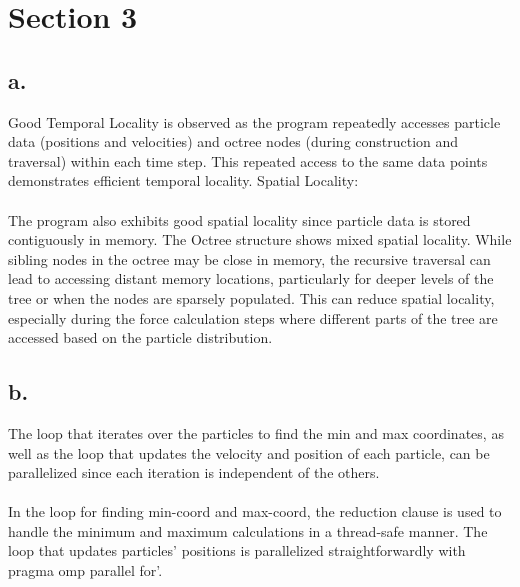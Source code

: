 \documentclass{article}
\begin{document}
\section*{Section 3}
\subsection*{a.}
Good Temporal Locality is observed as the program repeatedly accesses particle data (positions and velocities) and octree nodes (during construction and traversal) within each time step. This repeated access to the same data points demonstrates efficient temporal locality.
Spatial Locality:
\\
\\
The program also exhibits good spatial locality since particle data is stored contiguously in memory. The Octree structure shows mixed spatial locality. While sibling nodes in the octree may be close in memory, the recursive traversal can lead to accessing distant memory locations, particularly for deeper levels of the tree or when the nodes are sparsely populated. This can reduce spatial locality, especially during the force calculation steps where different parts of the tree are accessed based on the particle distribution.

\subsection*{b.}
The loop that iterates over the particles to find the min and max coordinates, as well as the loop that updates the velocity and position of each particle, can be parallelized since each iteration is independent of the others.
\\
\\
In the loop for finding min-coord and max-coord, the reduction clause is used to handle the minimum and maximum calculations in a thread-safe manner. The loop that updates particles' positions is parallelized straightforwardly with pragma omp parallel for'.
\end{document}
